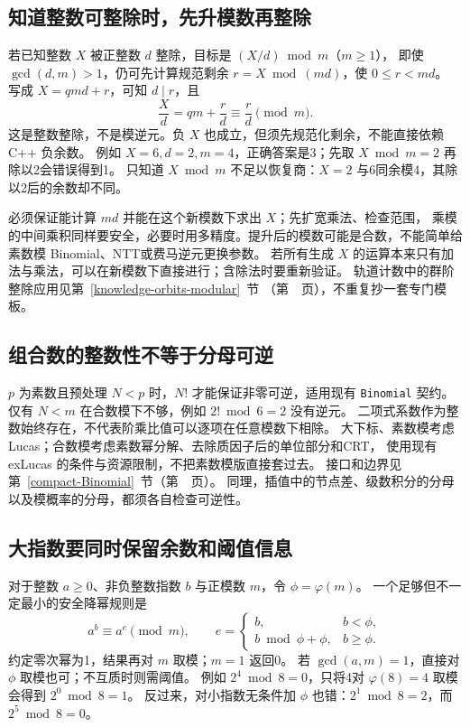 \clearpage
\subsection{知道整数可整除时，先升模数再整除}
若已知整数 $X$ 被正整数 $d$ 整除，目标是 $(X/d)\bmod m$（$m\ge1$），
即使 $\gcd(d,m)>1$，仍可先计算规范剩余 $r=X\bmod(md)$，使 $0\le r<md$。
写成 $X=qmd+r$，可知 $d\mid r$，且
\[
\frac Xd=qm+\frac rd\equiv\frac rd\pmod m.
\]
这是整数整除，不是模逆元。负 $X$ 也成立，但须先规范化剩余，不能直接依赖 C++ 负余数。
例如 $X=6,d=2,m=4$，正确答案是3；先取 $X\bmod m=2$ 再除以2会错误得到1。
只知道 $X\bmod m$ 不足以恢复商：$X=2$ 与6同余模4，其除以2后的余数却不同。

必须保证能计算 $md$ 并能在这个新模数下求出 $X$；先扩宽乘法、检查范围，
乘模的中间乘积同样要安全，必要时用多精度。提升后的模数可能是合数，不能简单给素数模 Binomial、NTT或费马逆元更换参数。
若所有生成 $X$ 的运算本来只有加法与乘法，可以在新模数下直接进行；含除法时要重新验证。
轨道计数中的群阶整除应用见第~\ref{knowledge-orbits-modular}~节
（第~\pageref{knowledge-orbits-modular}~页），不重复抄一套专门模板。

\subsection{组合数的整数性不等于分母可逆}
$p$ 为素数且预处理 $N<p$ 时，$N!$ 才能保证非零可逆，适用现有 \texttt{Binomial} 契约。
仅有 $N<m$ 在合数模下不够，例如 $2!\bmod6=2$ 没有逆元。
二项式系数作为整数始终存在，不代表阶乘比值可以逐项在任意模数下相除。
大下标、素数模考虑 Lucas；合数模考虑素数幂分解、去除质因子后的单位部分和CRT，
使用现有 exLucas 的条件与资源限制，不把素数模版直接套过去。
接口和边界见第~\ref{compact-Binomial}~节（第~\pageref{compact-Binomial}~页）。
同理，插值中的节点差、级数积分的分母以及模概率的分母，都须各自检查可逆性。

\clearpage
\subsection{大指数要同时保留余数和阈值信息}
对于整数 $a\ge0$、非负整数指数 $b$ 与正模数 $m$，令 $\phi=\varphi(m)$。
一个足够但不一定最小的安全降幂规则是
\[
a^b\equiv a^{e}\pmod m,\qquad
e=\begin{cases}
b,&b<\phi,\\
b\bmod\phi+\phi,&b\ge\phi.
\end{cases}
\]
约定零次幂为1，结果再对 $m$ 取模；$m=1$ 返回0。
若 $\gcd(a,m)=1$，直接对 $\phi$ 取模也可；不互质时则需阈值。
例如 $2^4\bmod8=0$，只将4对 $\varphi(8)=4$ 取模会得到 $2^0\bmod8=1$。
反过来，对小指数无条件加 $\phi$ 也错：$2^1\bmod8=2$，而 $2^5\bmod8=0$。

